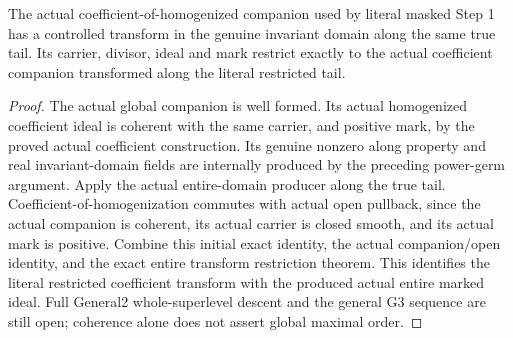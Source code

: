 \begin{theorem}
\label{hir:coherent-transform-literal-coefficient-extension}
\leanok
The actual coefficient-of-homogenized companion used by literal masked
Step 1 has a controlled transform in the genuine invariant domain along the same true
tail. Its carrier, divisor, ideal and mark restrict exactly to the actual
coefficient companion transformed along the literal restricted tail.
\end{theorem}
\begin{proof}
The actual global companion is well formed. Its actual homogenized
coefficient ideal is coherent with the same carrier, and positive mark,
by the proved actual coefficient construction. Its genuine nonzero along
property and real invariant-domain fields are internally produced by the
preceding power-germ argument. Apply the actual entire-domain producer along
the true tail. Coefficient-of-homogenization commutes with
actual open pullback, since the actual companion is coherent, its actual
carrier is closed smooth, and its actual mark is positive. Combine this
initial exact identity, the actual companion/open identity, and the exact
entire transform restriction theorem. This identifies the literal
restricted coefficient transform with the produced actual entire marked
ideal. Full General2 whole-superlevel descent and the general G3 sequence
are still open; coherence alone does not assert global maximal order.
\end{proof}
